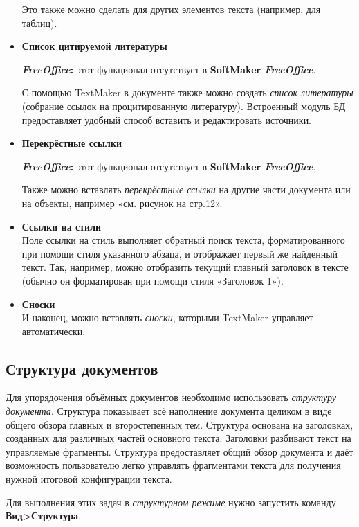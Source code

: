 ﻿\documentclass[a4paper,10pt]{article}
\begin{document}
\begin{itemize}
Это также можно сделать для других элементов текста (например, для таблиц).
\item \textbf{Список цитируемой литературы}\\
 \begin{mdframed}[backgroundcolor=pink!50]
\textbf{\textit{FreeOffice}:} этот функционал отсутствует в \textbf{SoftMaker \textit{FreeOffice}}.
\end{mdframed}
С помощью TextMaker в документе также можно создать \textit{список литературы} (собрание ссылок на процитированную литературу). Встроенный модуль БД предоставляет удобный способ вставить и редактировать источники.
\item \textbf{Перекрёстные ссылки}\\
\begin{mdframed}[backgroundcolor=pink!50]
\textbf{\textit{FreeOffice}:} этот функционал отсутствует в \textbf{SoftMaker \textit{FreeOffice}}.
\end{mdframed}
Также можно вставлять \textit{перекрёстные ссылки} на другие части документа или на объекты, например «см. рисунок на стр.12».
\item \textbf{Ссылки на стили}\\
Поле ссылки на стиль выполняет обратный поиск текста, форматированного при помощи стиля указанного абзаца, и отображает первый же найденный текст. Так, например, можно отобразить текущий главный заголовок в тексте (обычно он форматирован при помощи стиля «Заголовок 1»).
\item \textbf{Сноски}\\
И наконец, можно вставлять \textit{сноски}, которыми TextMaker управляет автоматически.
\end{itemize}

\subsection{Структура документов} \label{sec:структурадок}
Для упорядочения объёмных документов необходимо использовать \textit{структуру документа}. Структура показывает всё наполнение документа целиком в виде общего обзора главных и второстепенных тем. Структура основана на заголовках, созданных для различных частей основного текста. Заголовки разбивают текст на управляемые фрагменты. Структура предоставляет общий обзор документа и даёт возможность пользователю легко управлять фрагментами текста для получения нужной итоговой конфигурации текста.

Для выполнения этих задач в \textit{структурном режиме} нужно запустить команду \textbf{Вид>Структура}.
\end{document}
